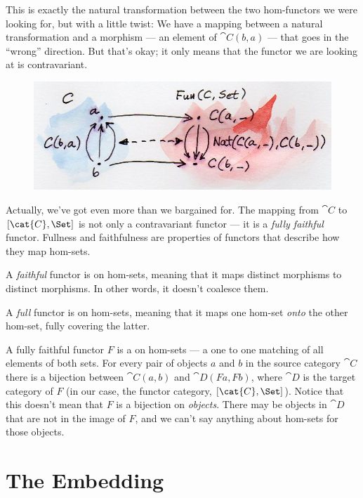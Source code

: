\noindent
This is exactly the natural transformation between the two hom-functors
we were looking for, but with a little twist: We have a mapping between
a natural transformation and a morphism --- an element of
$\cat{C}(b, a)$ --- that goes in the ``wrong'' direction. But that's
okay; it only means that the functor we are looking at is contravariant.

\begin{figure}[H]
\centering
\includegraphics[width=\textwidth]{images/yoneda-embedding-2.jpg}
\end{figure}

\noindent
Actually, we've got even more than we bargained for. The mapping from
$\cat{C}$ to $[\cat{C}, \Set]$ is not only a contravariant functor
--- it is a \emph{fully faithful} functor. Fullness and faithfulness are
properties of functors that describe how they map hom-sets.

A \emph{faithful} functor is  on hom-sets, meaning that
it maps distinct morphisms to distinct morphisms. In other words, it
doesn't coalesce them.

A \emph{full} functor is  on hom-sets, meaning that it
maps one hom-set \emph{onto} the other hom-set, fully covering the
latter.

A fully faithful functor $F$ is a  on hom-sets
--- a one to one matching of all elements of both sets. For every pair
of objects $a$ and $b$ in the source category $\cat{C}$
there is a bijection between $\cat{C}(a, b)$ and
$\cat{D}(F a, F b)$, where $\cat{D}$ is the target category of
$F$ (in our case, the functor category, $[\cat{C}, \Set]$).
Notice that this doesn't mean that $F$ is a bijection on
\emph{objects}. There may be objects in $\cat{D}$ that are not in the
image of $F$, and we can't say anything about hom-sets for those
objects.

\section{The Embedding}


